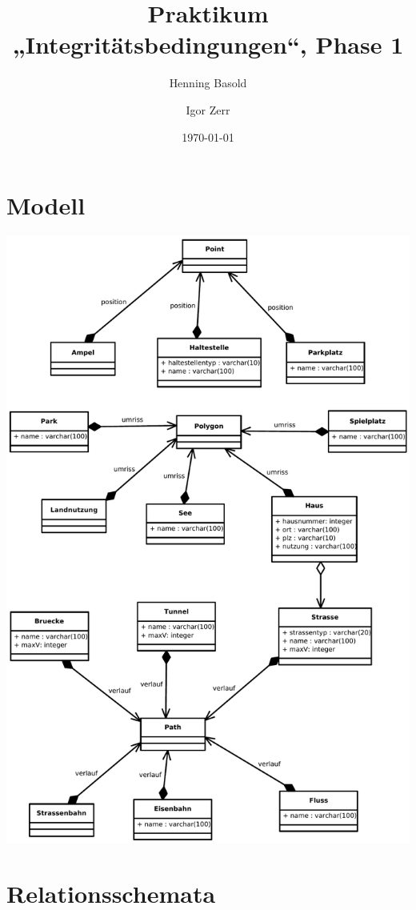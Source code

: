 \documentclass[a4paper]{article}
\title{Praktikum „Integritätsbedingungen“, Phase 1}
\author{Henning Basold \and Igor Zerr}
\date{\today}
\begin{document}
\maketitle
\section{Modell}
\includegraphics[width=\textwidth,keepaspectratio]{Model/model.pdf}

\section{Relationsschemata}

\end{document}
